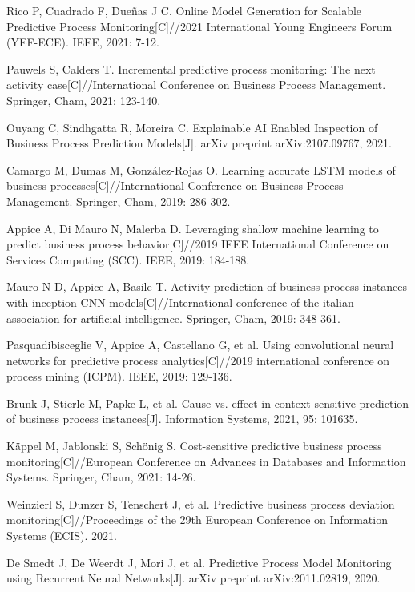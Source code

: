 \documentclass[runningheads]{llncs}
\begin{document}
\begin{thebibliography}{99}
	Rico P, Cuadrado F, Dueñas J C. Online Model Generation for Scalable Predictive Process Monitoring[C]//2021 International Young Engineers Forum (YEF-ECE). IEEE, 2021: 7-12.
	
	Pauwels S, Calders T. Incremental predictive process monitoring: The next activity case[C]//International Conference on Business Process Management. Springer, Cham, 2021: 123-140.
	
	Ouyang C, Sindhgatta R, Moreira C. Explainable AI Enabled Inspection of Business Process Prediction Models[J]. arXiv preprint arXiv:2107.09767, 2021.
	
	Camargo M, Dumas M, González-Rojas O. Learning accurate LSTM models of business processes[C]//International Conference on Business Process Management. Springer, Cham, 2019: 286-302.
	
	Appice A, Di Mauro N, Malerba D. Leveraging shallow machine learning to predict business process behavior[C]//2019 IEEE International Conference on Services Computing (SCC). IEEE, 2019: 184-188.
	
	Mauro N D, Appice A, Basile T. Activity prediction of business process instances with inception CNN models[C]//International conference of the italian association for artificial intelligence. Springer, Cham, 2019: 348-361.
	
	Pasquadibisceglie V, Appice A, Castellano G, et al. Using convolutional neural networks for predictive process analytics[C]//2019 international conference on process mining (ICPM). IEEE, 2019: 129-136.
	
	Brunk J, Stierle M, Papke L, et al. Cause vs. effect in context-sensitive prediction of business process instances[J]. Information Systems, 2021, 95: 101635.
	
	Käppel M, Jablonski S, Schönig S. Cost-sensitive predictive business process monitoring[C]//European Conference on Advances in Databases and Information Systems. Springer, Cham, 2021: 14-26.
	
	Weinzierl S, Dunzer S, Tenschert J, et al. Predictive business process deviation monitoring[C]//Proceedings of the 29th European Conference on Information Systems (ECIS). 2021.
	
	De Smedt J, De Weerdt J, Mori J, et al. Predictive Process Model Monitoring using Recurrent Neural Networks[J]. arXiv preprint arXiv:2011.02819, 2020.
	

\end{thebibliography}
\end{document}
